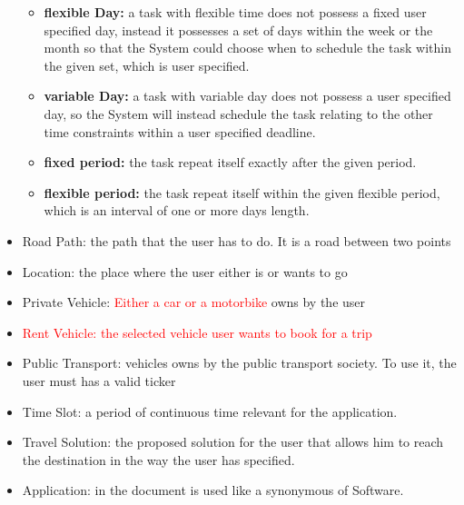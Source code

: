 \begin{itemize}
\begin{itemize}
       \item \textbf{flexible Day:}
       a task with flexible time does not possess a fixed user specified day,  instead it possesses a set of days within the week or the month so that the System could choose when to schedule the task within the given set, which is user specified. 
       
       \item \textbf{variable Day:} a task with variable day does not possess a user specified day, so the System will instead schedule the task relating to the other time constraints within a user specified deadline. 
       
       \item \textbf{fixed period:} the task repeat itself exactly after the given period.
       
       \item \textbf{flexible period:} the task repeat itself within the given flexible period, which is an interval of one or more days length.
       
    \end{itemize}
    
    \item Road Path: the path that the user has to do. It is a road between two points
    
    \item Location: the place where the user either is or wants to go
    
    \item Private Vehicle: \textcolor{red}{Either a car or a motorbike} owns by the user
    
    \item \textcolor{red}{Rent Vehicle: the selected vehicle user wants to book for a trip}
    
    \item Public Transport: vehicles owns by the public transport society. To use it, the user must has a valid ticker
    
    \item Time Slot: a period of continuous time relevant for the application.
    
    \item Travel Solution: the proposed solution for the user that allows him to reach the destination in the way the user has specified.
    
    \item Application: in the document is used like a synonymous of Software.
    

\end{itemize}
